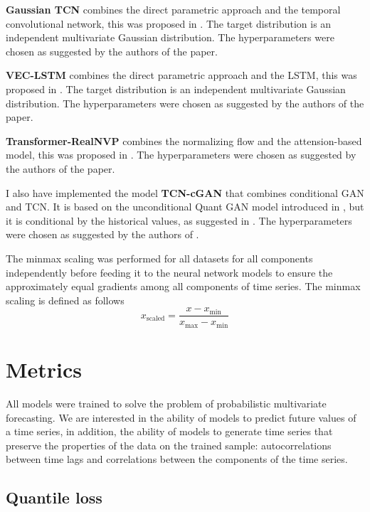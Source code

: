\documentclass[12pt,a4paper]{article}
\begin{document}
\textbf{Gaussian TCN} combines the direct parametric approach and the temporal convolutional network, this was proposed in \cite{gaussiantcn2020}. The target distribution is an independent multivariate Gaussian distribution. The hyperparameters were chosen as suggested by the authors of the paper.

\textbf{VEC-LSTM} combines the direct parametric approach and the LSTM, this was proposed in \cite{Salinas2019HighDimensionalMF}. The target distribution is an independent multivariate Gaussian distribution. The hyperparameters were chosen as suggested by the authors of the paper.

\textbf{Transformer-RealNVP} combines the normalizing flow and the attension-based model, this was proposed in \cite{normflow2021}. The hyperparameters were chosen as suggested by the authors of the paper.

I also have implemented the model \textbf{TCN-cGAN} that combines conditional GAN and TCN. It is based on the unconditional Quant GAN model introduced in \cite{quantgan2020}, but it is conditional by the historical values, as suggested in \cite{koochali2020like}. The hyperparameters were chosen as suggested by the authors of \cite{quantgan2020}.

The minmax scaling was performed for all datasets for all components independently before feeding it to the neural network models to ensure the approximately equal gradients among all components of time series. The minmax scaling is defined as follows
$$x_\text{scaled} = \frac{x-x_{\min}}{x_{\max} - x_{\min}}$$

\section{Metrics}

All models were trained to solve the problem of probabilistic multivariate forecasting. We are interested in the ability of models to predict future values of a time series, in addition, the ability of models to generate time series that preserve the properties of the data on the trained sample: autocorrelations between time lags and correlations between the components of the time series.

\subsection{Quantile loss}
\end{document}
